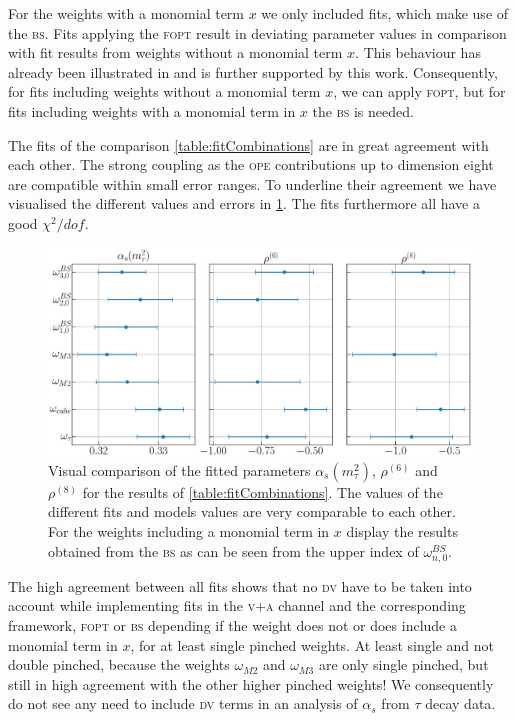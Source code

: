 \documentclass[../../index.tex]{subfiles}
\begin{document}
For the weights with a monomial term \(x\) we only included fits, which make use
of the \textsc{bs}. Fits applying the \textsc{fopt} result in deviating
parameter values in comparison with fit results from weights without a monomial
term \(x\). This behaviour has already been illustrated in \cite{Beneke2012} and
is further supported by this work. Consequently, for fits including weights
without a monomial term \(x\), we can apply \textsc{fopt}, but for fits
including weights with a monomial term in \(x\) the \textsc{bs} is needed.

The fits of the comparison \cref{table:fitCombinations} are in great agreement
with each other. The strong coupling as the \textsc{ope} contributions up to
dimension eight are compatible within small error ranges. To underline their
agreement we have visualised the different values and errors in
\cref{fig:comparisonAlC6C8}. The fits furthermore all have a good
\(\chi^2/dof\).
\begin{figure}
  \centering \includegraphics[width=\textwidth]{./images/comparisonAlC6C8.eps}
  \caption{Visual comparison of the fitted parameters \(\alpha_s(m_\tau^2)\),
    \(\rho^{(6)}\) and \(\rho^{(8)}\) for the results of
    \cref{table:fitCombinations}. The values of the different fits and models
    values are very comparable to each other. For the weights including a
    monomial term in \(x\) display the results obtained from the \textsc{bs} as
    can be seen from the upper index of \(\omega_{n,0}^{BS}\).}
  \label{fig:comparisonAlC6C8}
\end{figure}

The high agreement between all fits shows that no \textsc{dv} have to be taken
into account while implementing fits in the \textsc{v+a} channel and the
corresponding framework, \textsc{fopt} or \textsc{bs} depending if the weight
does not or does include a monomial term in \(x\), for at least single pinched
weights. At least single and not double pinched, because the weights
\(\omega_{M2}\) and \(\omega_{M3}\) are only single pinched, but still in high
agreement with the other higher pinched weights! We consequently do not see any
need to include \textsc{dv} terms in an analysis of \(\alpha_s\) from \(\tau\)
decay data.
\end{document}
